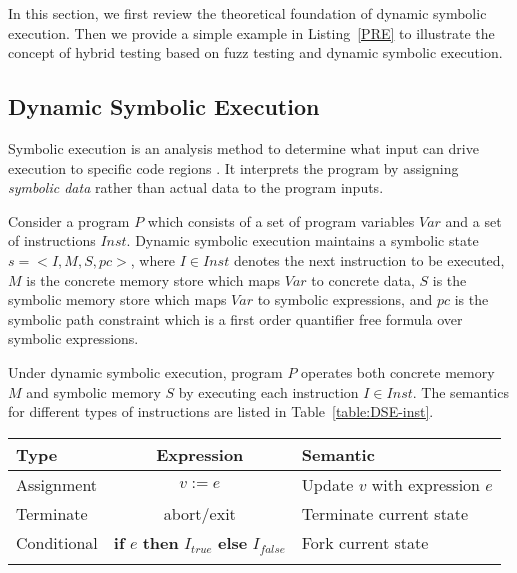 In this section, we first review the theoretical foundation of dynamic symbolic execution. Then we provide a simple example in Listing~\ref{PRE} to illustrate the concept of hybrid testing based on fuzz testing and dynamic symbolic execution.

\subsection{Dynamic Symbolic Execution}
Symbolic execution is an analysis method to determine what input can drive execution to specific code regions \cite{King:Symbex}. It interprets the program by assigning \textit{symbolic data} rather than actual data to the program inputs. 

Consider a program $P$ which consists of a set of program variables $Var$ and a set of instructions $Inst$.
 Dynamic symbolic execution maintains a symbolic state $s=<I,M,S,pc>$, where $I\in Inst$ denotes the next instruction to be executed, $M$ is the concrete memory store which maps $Var$ to concrete data, $S$ is the symbolic memory store which maps $Var$ to symbolic expressions, and $pc$ is the symbolic path constraint which is a first order quantifier free formula over symbolic expressions.

Under dynamic symbolic execution, program $P$ operates both concrete memory $M$ and symbolic memory $S$ by executing each instruction $I\in Inst$. The semantics for different types of instructions are listed in Table~\ref{table:DSE-inst}.

\begin{table}[!b]
{\begin{tabular*}{20pc}{@{\extracolsep{\fill}}lcl@{}}\toprule
Type  & Expression & Semantic\\
\midrule
Assignment   &  $v:=e$ & Update $v$ with expression $e$\\
Terminate    &  abort/exit & Terminate current state \\
Conditional  &  \textbf{if} $e$ \textbf{then} $I_{true}$ \textbf{else} $I_{false}$ & Fork current state\\
\botrule
\end{tabular*}}{}
\end{table}

